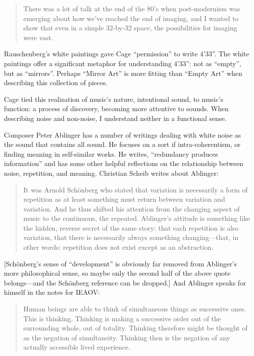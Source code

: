 \documentclass{thesis}
\begin{document}
	\begin{quote}
	There was a lot of talk at the end of the 80's when post-modernism was emerging about how we've reached the end of imaging, and I wanted to show that even in a simple 32-by-32 space, the possibilities for imaging were vast.\cite{matthew_mirapaul_in_1997}
	\end{quote}
	
	Rauschenberg's white paintings gave Cage ``permission'' to write 4'33''. The white paintings offer a significant metaphor for understanding 4'33'': not as ``empty'', but as ``mirrors''. Perhaps ``Mirror Art'' is more fitting than ``Empty Art'' when describing this collection of pieces.
	
	Cage tied this realization of music's nature, intentional sound, to music's function: a process of discovery, becoming more attentive to sounds. When describing noise and non-noise, I understand neither in a functional sense.
		
	Composer Peter Ablinger has a number of writings dealing with white noise as the sound that contains all sound. He focuses on a sort if intra-coherentism, or finding meaning in self-similar works. He writes, ``redundancy produces information''\cite{christian_scheib_statics_????} and has some other helpful reflections on the relationship between noise, repetition, and meaning. Christian Scheib writes about Ablinger:
	
	\begin{quote}
	It was Arnold Sch\"onberg who stated that variation is necessarily a form of repetition as at least something must return between variation and variation. And he thus shifted his attention from the changing aspect of music to the continuous, the repeated. Ablinger's attitude is something like the hidden, reverse secret of the same story: that each repetition is also variation, that there is necessarily always something changing---that, in other words: repetition does not exist except as an abstraction. 
	\end{quote}
	
	[Sch\"onberg's sense of ``development'' is obviously far removed from Ablinger's more philosophical sense, so maybe only the second half of the above quote belongs---and the Sch\"onberg reference can be dropped.]	And Ablinger speaks for himself in the notes for IEAOV:
	
	\begin{quote}
	Human beings are able to think of simultaneous things as successive ones. This is thinking. Thinking is making a successive order out of the surrounding whole, out of totality. Thinking therefore might be thought of as the negation of simultaneity. Thinking then is the negation of any actually accessible lived experience.
	\end{quote}
	
\end{document}
